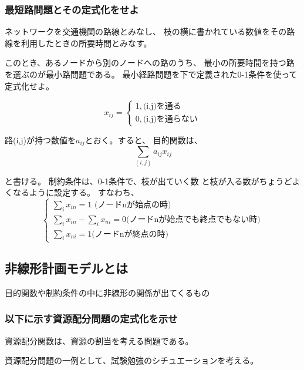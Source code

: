 \documentclass[9pt]{ltjsreport}
\begin{document}
\subsubsection{最短路問題とその定式化をせよ}
ネットワークを交通機関の路線とみなし、
枝の横に書かれている数値をその路線を利用したときの所要時間とみなす。

このとき、あるノードから別のノードへの路のうち、
最小の所要時間を持つ路を選ぶのが最小路問題である。
最小経路問題を下で定義された0-1条件を使って定式化せよ。
\begin{tcolorbox}[title=0-1条件]
    \begin{equation}
        x_{ij}=\begin{cases}
            1 , \text{(i,j)を通る}\\
            0 , \text{(i,j)を通らない}
        \end{cases}
    \end{equation}
\end{tcolorbox}

\hrulefill

路(i,j)が持つ数値を$a_{ij}$とおく。すると、
目的関数は、
\begin{equation}
    \sum_{(i,j)} a_{ij}x_{ij}
\end{equation}

と書ける。
制約条件は、0-1条件で、枝が出ていく数
と枝が入る数がちょうどよくなるように設定する。
すなわち、
\begin{equation*}
    \begin{cases}
    \sum_ix_{in}=1\text{ (ノードnが始点の時)}\\
    \sum_ix_{in}-\sum_ix_{ni}=0\text{(ノードnが始点でも終点でもない時)}\\
    \sum_ix_{ni}=1\text{(ノードnが終点の時)}
    \end{cases}
\end{equation*}


\newpage

\subsection{非線形計画モデルとは}
目的関数や制約条件の中に非線形の関係が出てくるもの
\subsubsection{以下に示す資源配分問題の定式化を示せ}
資源配分関数は、資源の割当を考える問題である。

資源配分問題の一例として、試験勉強のシチュエーションを考える。
\end{document}
